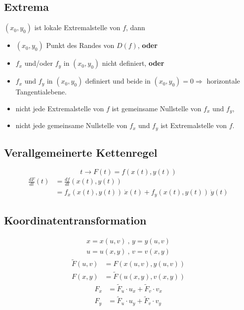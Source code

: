 \documentclass[12pt]{article}
\begin{document}
\begin{multicols*}{3}
			\subsection{Extrema} %
				$(x_0,y_0)$ ist lokale Extremalstelle von $f$, dann
				\begin{itemize}
					\item $(x_0,y_0)$ Punkt des Randes von $D(f)$, \textbf{oder}
					\item $f_x$ und/oder $f_y$ in $(x_0,y_0)$ nicht definiert, \textbf{oder}
					\item $f_x$ und $f_y$ in $(x_0,y_0)$ definiert und beide in $(x_0,y_0) = 0 \Rightarrow$ horizontale Tangentialebene.
				\end{itemize}
				
				\begin{itemize}
					\item nicht jede Extremalstelle von $f$ ist gemeinsame Nullstelle von $f_x$ und $f_y$,
					\item nicht jede gemeinsame Nullstelle von $f_x$ und $f_y$ ist Extremalstelle von $f$.
				\end{itemize}
			\subsection{Verallgemeinerte Kettenregel} %
				\[
					t \rightarrow F(t) = f(x(t), y(t))
				\]
				\begin{align*}
					\frac{dF}{dt}(t) &= \frac{df}{dt}(x(t),y(t)) \\ &= f_x(x(t),y(t)) \ \dot{x}(t) + f_y(x(t),y(t)) \ \dot{y}(t)
				\end{align*}
			\subsection{Koordinatentransformation} %
				\begin{gather*}
					x = x(u,v) \ , \, y = y(u,v) \\
					u = u(x,y) \ , \, v = v(x,y)
				\end{gather*}
				\begin{align*}
					\tilde{F}(u,v) &= F(x(u,v),y(u,v)) \\
					F(x,y) &= \tilde{F}(u(x,y),v(x,y))
				\end{align*}
				\begin{align*}
					F_x &= \tilde{F}_u \cdot u_x + \tilde{F}_v \cdot v_x \\
					F_y &= \tilde{F}_u \cdot u_y + \tilde{F}_v \cdot v_y
				\end{align*}

\end{multicols*}
\end{document}

